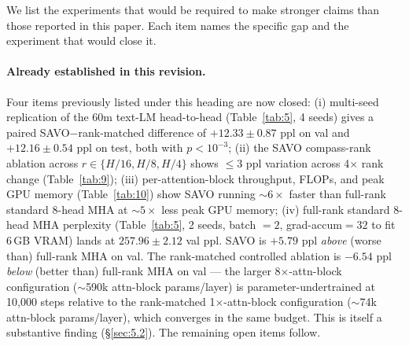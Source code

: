 We list the experiments that would be required to make stronger claims than those reported in this paper. Each item names the specific gap and the experiment that would close it.

\paragraph{Already established in this revision.}
Four items previously listed under this heading are now closed: (i) multi-seed replication of the 60m text-LM head-to-head (Table~\ref{tab:5}, 4 seeds) gives a paired SAVO$-$rank-matched difference of $+12.33 \pm 0.87$ ppl on val and $+12.16 \pm 0.54$ ppl on test, both with $p < 10^{-3}$; (ii) the SAVO compass-rank ablation across $r \in \{H/16, H/8, H/4\}$ shows $\leq 3$ ppl variation across 4$\times$ rank change (Table~\ref{tab:9}); (iii) per-attention-block throughput, FLOPs, and peak GPU memory (Table~\ref{tab:10}) show SAVO running ${\sim}6\times$ faster than full-rank standard 8-head MHA at ${\sim}5\times$ less peak GPU memory; (iv) full-rank standard 8-head MHA perplexity (Table~\ref{tab:5}, 2 seeds, batch $=2$, grad-accum$=32$ to fit 6\,GB VRAM) lands at $257.96 \pm 2.12$ val ppl. SAVO is $+5.79$ ppl \emph{above} (worse than) full-rank MHA on val. The rank-matched controlled ablation is $-6.54$ ppl \emph{below} (better than) full-rank MHA on val --- the larger 8$\times$-attn-block configuration (${\sim}$590k attn-block params/layer) is parameter-undertrained at 10,000 steps relative to the rank-matched 1$\times$-attn-block configuration (${\sim}$74k attn-block params/layer), which converges in the same budget. This is itself a substantive finding (\S\ref{sec:5.2}). The remaining open items follow.

